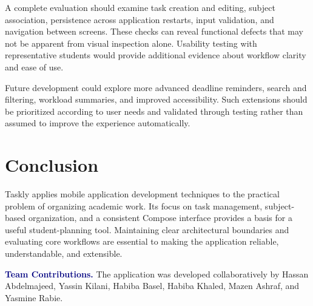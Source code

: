 \documentclass[10pt,a4paper,twocolumn]{article}
\begin{document}
A complete evaluation should examine task creation and editing,
subject association, persistence across application restarts, input
validation, and navigation between screens. These checks can reveal
functional defects that may not be apparent from visual inspection
alone. Usability testing with representative students would provide
additional evidence about workflow clarity and ease of use.

Future development could explore more advanced deadline reminders,
search and filtering, workload summaries, and improved accessibility.
Such extensions should be prioritized according to user needs and
validated through testing rather than assumed to improve the experience
automatically.

\section{Conclusion}

Taskly applies mobile application development techniques to the
practical problem of organizing academic work. Its focus on task
management, subject-based organization, and a consistent Compose
interface provides a basis for a useful student-planning tool.
Maintaining clear architectural boundaries and evaluating core
workflows are essential to making the application reliable,
understandable, and extensible.

\vspace{3pt}
\noindent\textbf{\textcolor{navy}{Team Contributions.}}
The application was developed collaboratively by Hassan Abdelmajeed,
Yassin Kilani, Habiba Basel, Habiba Khaled, Mazen Ashraf, and
Yasmine Rabie.
\end{document}
